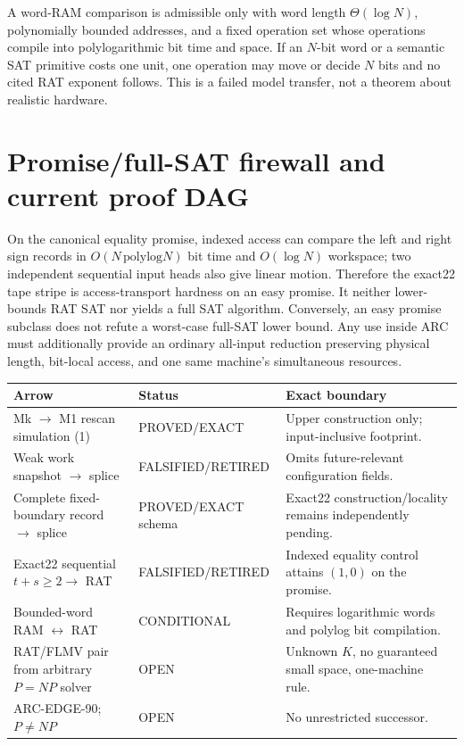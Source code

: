 \documentclass[11pt]{article}
\begin{document}
A word-RAM comparison is admissible only with word length
$\Theta(\log N)$, polynomially bounded addresses, and a fixed operation set
whose operations compile into polylogarithmic bit time and space.  If an
$N$-bit word or a semantic SAT primitive costs one unit, one operation may
move or decide $N$ bits and no cited RAT exponent follows.  This is a failed
model transfer, not a theorem about realistic hardware.

\section{Promise/full-SAT firewall and current proof DAG}
On the canonical equality promise, indexed access can compare the left and
right sign records in $O(N\,\mathrm{polylog}N)$ bit time and $O(\log N)$
workspace; two independent sequential input heads also give linear motion.
Therefore the exact22 tape stripe is access-transport hardness on an easy
promise.  It neither lower-bounds RAT SAT nor yields a full SAT algorithm.
Conversely, an easy promise subclass does not refute a worst-case full-SAT
lower bound.  Any use inside ARC must additionally provide an ordinary
all-input reduction preserving physical length, bit-local access, and one
same machine's simultaneous resources.

\begin{center}\small
\begin{tabular}{p{.34\linewidth}p{.18\linewidth}p{.38\linewidth}}
\toprule
Arrow & Status & Exact boundary\\\midrule
Mk $\to$ M1 rescan simulation (1) & PROVED/EXACT & Upper construction only; input-inclusive footprint.\\
Weak work snapshot $\to$ splice & FALSIFIED/RETIRED & Omits future-relevant configuration fields.\\
Complete fixed-boundary record $\to$ splice & PROVED/EXACT schema & Exact22 construction/locality remains independently pending.\\
Exact22 sequential $t+s\ge2\to$ RAT & FALSIFIED/RETIRED & Indexed equality control attains $(1,0)$ on the promise.\\
Bounded-word RAM $\leftrightarrow$ RAT & CONDITIONAL & Requires logarithmic words and polylog bit compilation.\\
RAT/FLMV pair from arbitrary $P=NP$ solver & OPEN & Unknown $K$, no guaranteed small space, one-machine rule.\\
ARC-EDGE-90; $P\ne NP$ & OPEN & No unrestricted successor.\\\bottomrule
\end{tabular}
\end{center}
\end{document}
